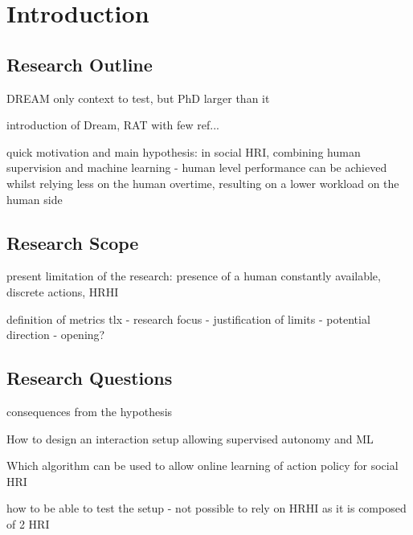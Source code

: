 \chapter{Introduction}

\section{Research Outline} %

DREAM only context to test, but PhD larger than it

introduction of Dream, RAT with few ref...

quick motivation and main hypothesis:
in social HRI, combining human supervision and machine learning - human level performance can be achieved whilst relying less on the human overtime, resulting on a lower workload on the human side

\section{Research Scope}

present limitation of the research: presence of a human constantly available, discrete actions, HRHI

definition of metrics tlx - research focus - justification of limits - potential direction - opening?

\section{Research Questions}

consequences from the hypothesis

How to design an interaction setup allowing supervised autonomy and ML

Which algorithm can be used to allow online learning of action policy for social HRI

how to be able to test the setup - not possible to rely on HRHI as it is composed of 2 HRI